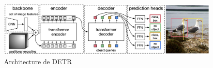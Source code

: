 \begin{figure}[th!]
    \centering
    \includegraphics[width=\textwidth]{images/detr_architecture.png}
    \caption{Architecture de DETR}
    \label{fig:detr_architecture}
\end{figure}
